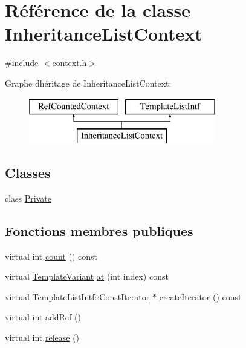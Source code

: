 \hypertarget{class_inheritance_list_context}{}\section{Référence de la classe Inheritance\+List\+Context}
\label{class_inheritance_list_context}


{\ttfamily \#include $<$context.\+h$>$}

Graphe d\textquotesingle{}héritage de Inheritance\+List\+Context\+:\begin{figure}[H]
\begin{center}
\leavevmode
\includegraphics[height=2.000000cm]{class_inheritance_list_context}
\end{center}
\end{figure}
\subsection*{Classes}
\begin{DoxyCompactItemize}
\item 
class \hyperlink{class_inheritance_list_context_1_1_private}{Private}
\end{DoxyCompactItemize}
\subsection*{Fonctions membres publiques}
\begin{DoxyCompactItemize}
\item 
virtual int \hyperlink{class_inheritance_list_context_ab7d0e78b8ec62db9be8c3067adf42a61}{count} () const 
\item 
virtual \hyperlink{class_template_variant}{Template\+Variant} \hyperlink{class_inheritance_list_context_a772b536931f8e05035ef9fde1694d9fa}{at} (int index) const 
\item 
virtual \hyperlink{class_template_list_intf_1_1_const_iterator}{Template\+List\+Intf\+::\+Const\+Iterator} $\ast$ \hyperlink{class_inheritance_list_context_a8aa53abe84876a024a25b63af3511656}{create\+Iterator} () const 
\item 
virtual int \hyperlink{class_inheritance_list_context_aedfb5cadd50ed52c6f1632cbcdbfa85d}{add\+Ref} ()
\item 
virtual int \hyperlink{class_inheritance_list_context_a1ab111b2d69cdf8920529f5674dba6d9}{release} ()
\end{DoxyCompactItemize}
